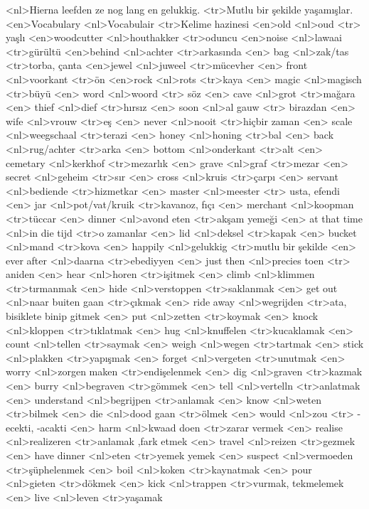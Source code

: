 <nl>Hierna leefden ze nog lang en gelukkig. 
<tr>Mutlu bir şekilde yaşamışlar.
<en>Vocabulary
<nl>Vocabulair
<tr>Kelime hazinesi
<en>old
<nl>oud 
<tr> yaşlı
<en>woodcutter
<nl>houthakker 
<tr>oduncu
<en>noise 
<nl>lawaai
<tr>gürültü
<en>behind 
<nl>achter 
<tr>arkasında
<en> bag 
<nl>zak/tas 
<tr>torba, çanta
<en>jewel 
<nl>juweel 
<tr>mücevher
<en> front 
<nl>voorkant 
<tr>ön
<en>rock 
<nl>rots 
<tr>kaya
<en> magic 
<nl>magisch 
<tr>büyü
<en> word 
<nl>woord 
<tr> söz
<en> cave 
<nl>grot 
<tr>mağara
<en> thief 
<nl>dief 
<tr>hırsız
<en> soon 
<nl>al gauw 
<tr> birazdan
<en> wife 
<nl>vrouw 
<tr>eş
<en> never 
<nl>nooit 
<tr>hiçbir zaman
<en> scale 
<nl>weegschaal 
<tr>terazi
<en> honey 
<nl>honing 
<tr>bal
<en> back 
<nl>rug/achter 
<tr>arka
<en> bottom 
<nl>onderkant 
<tr>alt
<en> cemetary 
<nl>kerkhof 
<tr>mezarlık
<en> grave 
<nl>graf 
<tr>mezar
<en> secret 
<nl>geheim 
<tr>sır
<en> cross 
<nl>kruis 
<tr>çarpı
<en> servant 
<nl>bediende 
<tr>hizmetkar
<en> master 
<nl>meester 
<tr> usta, efendi
<en> jar 
<nl>pot/vat/kruik 
<tr>kavanoz, fıçı
<en> merchant 
<nl>koopman 
<tr>tüccar
<en> dinner 
<nl>avond eten 
<tr>akşam yemeği
<en> at that time 
<nl>in die tijd  
<tr>o zamanlar 
<en> lid 
<nl>deksel 
<tr>kapak
<en> bucket 
<nl>mand 
<tr>kova
<en> happily 
<nl>gelukkig 
<tr>mutlu bir şekilde
<en> ever after 
<nl>daarna 
<tr>ebediyyen
<en> just then 
<nl>precies toen 
<tr> aniden
<en> hear 
<nl>horen 
<tr>işitmek
<en> climb 
<nl>klimmen 
<tr>tırmanmak
<en> hide 
<nl>verstoppen 
<tr>saklanmak
<en> get out 
<nl>naar buiten gaan 
<tr>çıkmak 
<en> ride away 
<nl>wegrijden 
<tr>ata, bisiklete binip gitmek
<en> put 
<nl>zetten 
<tr>koymak
<en> knock 
<nl>kloppen 
<tr>tıklatmak
<en> hug 
<nl>knuffelen 
<tr>kucaklamak
<en> count 
<nl>tellen 
<tr>saymak
<en> weigh 
<nl>wegen 
<tr>tartmak
<en> stick 
<nl>plakken 
<tr>yapışmak
<en> forget 
<nl>vergeten 
<tr>unutmak
<en> worry 
<nl>zorgen maken 
<tr>endişelenmek
<en> dig 
<nl>graven 
<tr>kazmak
<en> burry 
<nl>begraven 
<tr>gömmek
<en> tell 
<nl>vertelln 
<tr>anlatmak
<en> understand 
<nl>begrijpen 
<tr>anlamak
<en> know 
<nl>weten 
<tr>bilmek
<en> die 
<nl>dood gaan 
<tr>ölmek
<en> would 
<nl>zou 
<tr> -ecekti, -acakti
<en> harm 
<nl>kwaad doen 
<tr>zarar vermek
<en> realise 
<nl>realizeren 
<tr>anlamak ,fark etmek
<en> travel 
<nl>reizen 
<tr>gezmek
<en> have dinner 
<nl>eten 
<tr>yemek yemek
<en> suspect 
<nl>vermoeden 
<tr>şüphelenmek
<en> boil 
<nl>koken 
<tr>kaynatmak
<en> pour 
<nl>gieten 
<tr>dökmek
<en> kick 
<nl>trappen 
<tr>vurmak, tekmelemek
<en> live 
<nl>leven 
<tr>yaşamak
